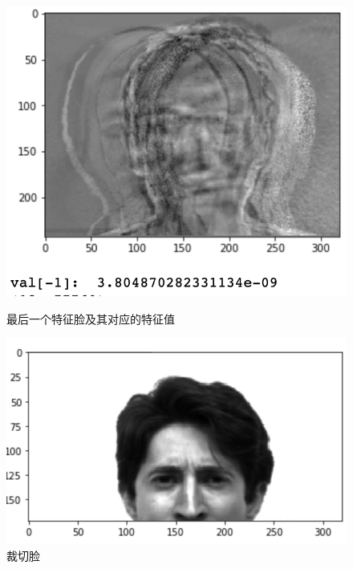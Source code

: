 \documentclass{ctexart}
\begin{document}
    \begin{figure}[htbp]
        \begin{minipage}[t]{0.45 \linewidth}
            \centering
            \includegraphics[scale=0.45]{imgs/not-full-rank.png}
            \caption{最后一个特征脸及其对应的特征值}
            \label{not-full-rank}
            \end{minipage}
        \begin{minipage}[t]{0.45 \linewidth}
            \centering
            \includegraphics[scale=0.45]{imgs/semi_face.png}
            \caption{裁切脸}
            \label{cropface}
        \end{minipage}
    \end{figure}
\end{document}
